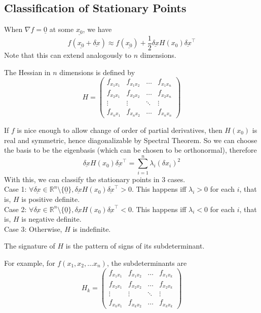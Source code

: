 \subsection{Classification of Stationary Points}
When $\nabla f=\underline{0}$ at some $\underline{x_0}$, we have
$$f(\underline{x_0}+\underline{\delta x})\approx f(\underline{x_0})+\frac{1}{2}\underline{\delta x} H(x_0)\underline{\delta x}^\top$$
Note that this can extend analogously to $n$ dimensions.
\begin{definition}
    The Hessian in $n$ dimensions is defined by
    $$H=
    \begin{pmatrix}
        f_{x_1x_1}&f_{x_1x_2}&\dots&f_{x_1x_n}\\
        f_{x_2x_1}&f_{x_2x_2}&\dots&f_{x_2x_n}\\
        \vdots&\vdots&\ddots&\vdots\\
        f_{x_nx_1}&f_{x_nx_2}&\dots&f_{x_nx_n}
    \end{pmatrix}$$
\end{definition}
If $f$ is nice enough to allow change of order of partial derivatives, then $H(x_0)$ is real and symmetric, hence diagonalizable by Spectral Theorem.
So we can choose the basis to be the eigenbasis (which can be chosen to be orthonormal), therefore
$$\underline{\delta x}H(x_0)\underline{\delta x}^\top=\sum_{i=1}^n\lambda_i(\delta x_i)^2$$
With this, we can classify the stationary points in $3$ cases.\\
Case 1: $\forall\underline{\delta x}\in\mathbb R^n\setminus\{\underline{0}\},\underline{\delta x}H(x_0)\underline{\delta x}^\top>0$.
This happens iff $\lambda_i>0$ for each $i$, that is, $H$ is positive definite.\\
Case 2: $\forall\underline{\delta x}\in\mathbb R^n\setminus\{\underline{0}\},\underline{\delta x}H(x_0)\underline{\delta x}^\top<0$.
This happens iff $\lambda_i<0$ for each $i$, that is, $H$ is negative definite.\\
Case 3: Otherwise, $H$ is indefinite.
\begin{definition}
    The signature of $H$ is the pattern of signs of its subdeterminant.
\end{definition}
For example, for $f(x_1,x_2,\ldots x_n)$, the subdeterminants are
$$H_k=
\begin{pmatrix}
    f_{x_1x_1}&f_{x_1x_2}&\dots&f_{x_1x_k}\\
    f_{x_2x_1}&f_{x_2x_2}&\dots&f_{x_2x_k}\\
    \vdots&\vdots&\ddots&\vdots\\
    f_{x_kx_1}&f_{x_kx_2}&\dots&f_{x_kx_k}
\end{pmatrix}$$
